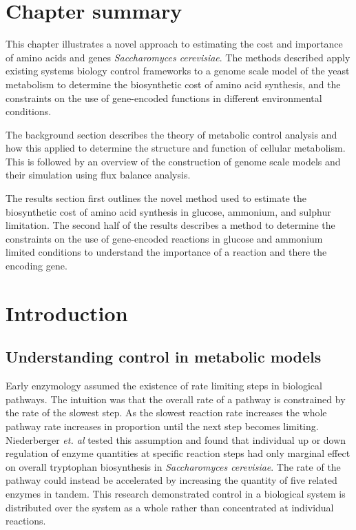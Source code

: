 \section*{Chapter summary}

This chapter illustrates a novel approach to estimating the cost and importance of amino acids and genes \emph{Saccharomyces cerevisiae}. The methods described apply existing systems biology control frameworks to a genome scale model of the yeast metabolism to determine the biosynthetic cost of amino acid synthesis, and the constraints on the use of gene-encoded functions in different environmental conditions.

The background section describes the theory of metabolic control analysis and how this applied to determine the structure and function of cellular metabolism. This is followed by an overview of the construction of genome scale models and their simulation using flux balance analysis.

The results section first outlines the novel method used to estimate the biosynthetic cost of amino acid synthesis in glucose, ammonium, and sulphur limitation. The second half of the results describes a method to determine the constraints on the use of gene-encoded reactions in glucose and ammonium limited conditions to understand the importance of a reaction and there the encoding gene.

\clearpage

\section{Introduction}

\subsection{Understanding control in metabolic models}

Early enzymology assumed the existence of rate limiting steps in biological pathways. The intuition was that the overall rate of a pathway is constrained by the rate of the slowest step. As the slowest reaction rate increases the whole pathway rate increases in proportion until the next step becomes limiting. Niederberger \emph{et. al} \cite{niederberger1992} tested this assumption and found that individual up or down regulation of enzyme quantities at specific reaction steps had only marginal effect on overall tryptophan biosynthesis in \emph{Saccharomyces cerevisiae}. The rate of the pathway could instead be accelerated by increasing the quantity of five related enzymes in tandem. This research demonstrated control in a biological system is distributed over the system as a whole rather than concentrated at individual reactions.

